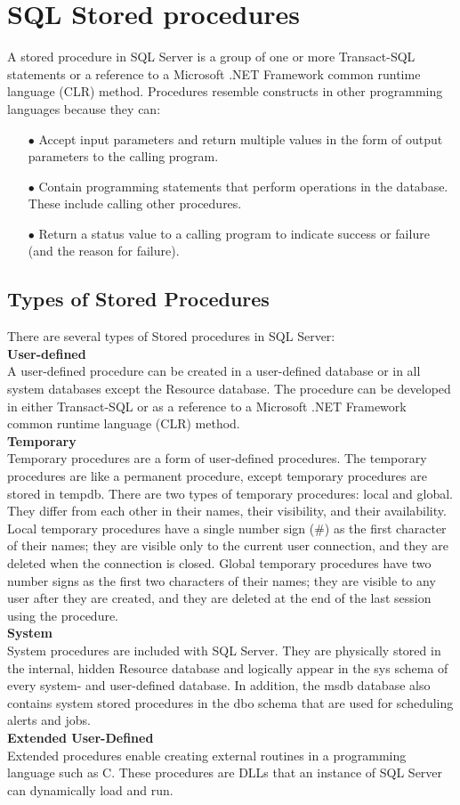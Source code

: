 \section{SQL Stored procedures}

A stored procedure in SQL Server is a group of one or more Transact-SQL statements or a reference to a Microsoft .NET Framework common runtime language (CLR) method. Procedures resemble constructs in other programming languages because they can:
\begin{itemize}
  \item[$\bullet$] Accept input parameters and return multiple values in the form of output parameters to the calling program.
  \item[$\bullet$] Contain programming statements that perform operations in the database. These include calling other procedures.
  \item[$\bullet$] Return a status value to a calling program to indicate success or failure (and the reason for failure).
\end{itemize}
\subsection{Types of Stored Procedures}
There are several types of Stored procedures in SQL Server: \\
\textbf{User-defined}\\
A user-defined procedure can be created in a user-defined database or in all system databases except the Resource database. The procedure can be developed in either Transact-SQL or as a reference to a Microsoft .NET Framework common runtime language (CLR) method.\\
\textbf{Temporary}\\
Temporary procedures are a form of user-defined procedures. The temporary procedures are like a permanent procedure, except temporary procedures are stored in tempdb. There are two types of temporary procedures: local and global. They differ from each other in their names, their visibility, and their availability. Local temporary procedures have a single number sign (\#) as the first character of their names; they are visible only to the current user connection, and they are deleted when the connection is closed. Global temporary procedures have two number signs  as the first two characters of their names; they are visible to any user after they are created, and they are deleted at the end of the last session using the procedure.\\
\textbf{System}\\
System procedures are included with SQL Server. They are physically stored in the internal, hidden Resource database and logically appear in the sys schema of every system- and user-defined database. In addition, the msdb database also contains system stored procedures in the dbo schema that are used for scheduling alerts and jobs.\\
\textbf{Extended User-Defined}\\
Extended procedures enable creating external routines in a programming language such as C. These procedures are DLLs that an instance of SQL Server can dynamically load and run.

